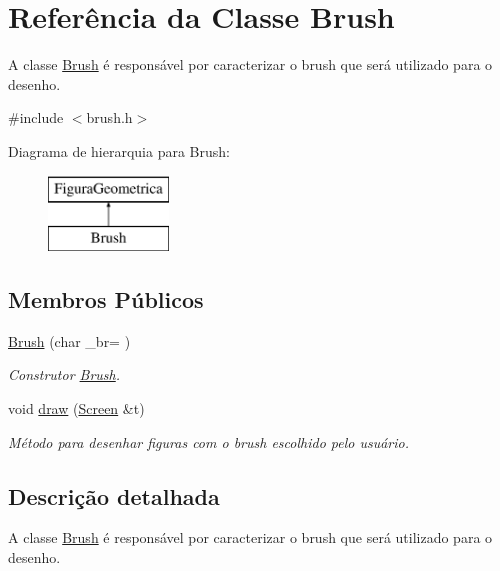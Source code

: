 \hypertarget{class_brush}{}\section{Referência da Classe Brush}
\label{class_brush}


A classe \mbox{\hyperlink{class_brush}{Brush}} é responsável por caracterizar o brush que será utilizado para o desenho.  




{\ttfamily \#include $<$brush.\+h$>$}

Diagrama de hierarquia para Brush\+:\begin{figure}[H]
\begin{center}
\leavevmode
\includegraphics[height=2.000000cm]{class_brush}
\end{center}
\end{figure}
\subsection*{Membros Públicos}
\begin{DoxyCompactItemize}
\item 
\mbox{\hyperlink{class_brush_a5ded381f29fa4566fbce96f623baecab}{Brush}} (char \+\_\+br=\textquotesingle{} \textquotesingle{})
\begin{DoxyCompactList}\small\item\em Construtor \mbox{\hyperlink{class_brush}{Brush}}. \end{DoxyCompactList}\item 
void \mbox{\hyperlink{class_brush_ad12c371aba8d8770df593ef94ae14dd0}{draw}} (\mbox{\hyperlink{class_screen}{Screen}} \&t)
\begin{DoxyCompactList}\small\item\em Método para desenhar figuras com o brush escolhido pelo usuário. \end{DoxyCompactList}\end{DoxyCompactItemize}


\subsection{Descrição detalhada}
A classe \mbox{\hyperlink{class_brush}{Brush}} é responsável por caracterizar o brush que será utilizado para o desenho. 

